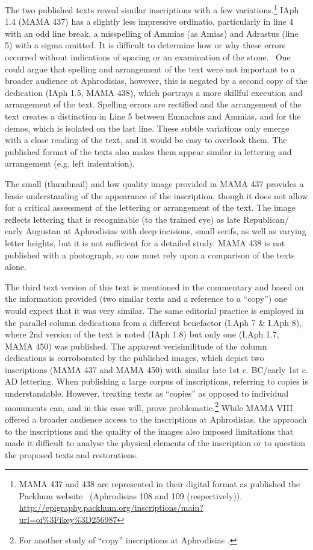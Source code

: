 \documentclass[amsthm,ebook]{saparticle}
\begin{document}
The two published texts reveal similar inscriptions with a few variations.\footnote{ MAMA 437 and 438 are represented in
their digital format as published the Packhum website \ (Aphrodisias 108 and 109 (respectively)).
\url{http://epigraphy.packhum.org/inscriptions/main?url=oi\%3Fikey\%3D256987}} IAph 1.4 (MAMA 437) has a slightly less
impressive ordinatio, particularly in line 4 with an odd line break, a misspelling of Ammias (as Amias) and Adrastus
(line 5) with a sigma omitted. It is difficult to determine how or why these errors occurred without indications of
spacing or an examination of the stone. \ One could argue that spelling and arrangement of the text were not important
to a broader audience at Aphrodisias, however, this is negated by a second copy of the dedication (IAph 1.5, MAMA 438),
which portrays a more skillful execution and arrangement of the text. Spelling errors are rectified and the arrangement
of the text creates a distinction in Line 5 between Eumachus and Ammias, and for the demos, which is isolated on the
last line. These subtle variations only emerge with a close reading of the text, and it would be easy to overlook them.
The published format of the texts also makes them appear similar in lettering and arrangement (e.g. left indentation).





The small (thumbnail) and low quality image provided in MAMA 437 provides a basic understanding of the appearance of the
inscription, though it does not allow for a critical assessment of the lettering or arrangement of the text. The image
reflects lettering that is recognizable (to the trained eye) as late Republican/ early Augustan at Aphrodisias with
deep incisions, small serifs, as well as varying letter heights, but it is not sufficient for a detailed study. MAMA
438 is not published with a photograph, so one must rely upon a comparison of the texts alone.




The third text version of this text is mentioned in the commentary and based on the information provided (two similar
texts and a reference to a ``copy'') one would expect that it was very similar. The same editorial practice is employed
in the parallel column dedications from a different benefactor (I.Aph 7 \& I.Aph 8), where 2nd version of the text is
noted (IAph 1.8) but only one (I.Aph 1.7, MAMA 450) was published. The apparent verisimilitude of the column
dedications is corroborated by the published images, which depict two inscriptions (MAMA 437 and MAMA 450) with similar
late 1st c. BC/early 1st c. AD lettering. When publishing a large corpus of inscriptions, referring to copies is
understandable. However, treating texts as ``copies'' as opposed to individual monuments can, and in this case will,
prove problematic.\footnote{ For another study of ``copy'' inscriptions at Aphrodisias  \citet{Graham2015}.}
While MAMA VIII offered a broader audience access to the inscriptions at Aphrodisias, the approach to the inscriptions
and the quality of the images also imposed limitations that made it difficult to analyse the physical elements of the
inscription or to question the proposed texts and restorations. 
\end{document}

